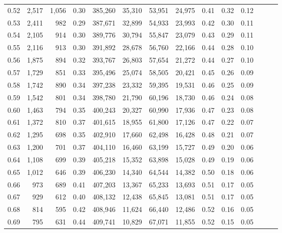 \begin{tabular}{rrrrrrrrrrrrrr}
0.52 &   2,517 &  1,056 &  0.30 &  385,260 &   35,310 &  53,951 &  24,975 &  0.41 &  0.32 &      0.12 \\
0.53 &   2,411 &    982 &  0.29 &  387,671 &   32,899 &  54,933 &  23,993 &  0.42 &  0.30 &      0.11 \\
0.54 &   2,105 &    914 &  0.30 &  389,776 &   30,794 &  55,847 &  23,079 &  0.43 &  0.29 &      0.11 \\
0.55 &   2,116 &    913 &  0.30 &  391,892 &   28,678 &  56,760 &  22,166 &  0.44 &  0.28 &      0.10 \\
0.56 &   1,875 &    894 &  0.32 &  393,767 &   26,803 &  57,654 &  21,272 &  0.44 &  0.27 &      0.10 \\
0.57 &   1,729 &    851 &  0.33 &  395,496 &   25,074 &  58,505 &  20,421 &  0.45 &  0.26 &      0.09 \\
0.58 &   1,742 &    890 &  0.34 &  397,238 &   23,332 &  59,395 &  19,531 &  0.46 &  0.25 &      0.09 \\
0.59 &   1,542 &    801 &  0.34 &  398,780 &   21,790 &  60,196 &  18,730 &  0.46 &  0.24 &      0.08 \\
0.60 &   1,463 &    794 &  0.35 &  400,243 &   20,327 &  60,990 &  17,936 &  0.47 &  0.23 &      0.08 \\
0.61 &   1,372 &    810 &  0.37 &  401,615 &   18,955 &  61,800 &  17,126 &  0.47 &  0.22 &      0.07 \\
0.62 &   1,295 &    698 &  0.35 &  402,910 &   17,660 &  62,498 &  16,428 &  0.48 &  0.21 &      0.07 \\
0.63 &   1,200 &    701 &  0.37 &  404,110 &   16,460 &  63,199 &  15,727 &  0.49 &  0.20 &      0.06 \\
0.64 &   1,108 &    699 &  0.39 &  405,218 &   15,352 &  63,898 &  15,028 &  0.49 &  0.19 &      0.06 \\
0.65 &   1,012 &    646 &  0.39 &  406,230 &   14,340 &  64,544 &  14,382 &  0.50 &  0.18 &      0.06 \\
0.66 &     973 &    689 &  0.41 &  407,203 &   13,367 &  65,233 &  13,693 &  0.51 &  0.17 &      0.05 \\
0.67 &     929 &    612 &  0.40 &  408,132 &   12,438 &  65,845 &  13,081 &  0.51 &  0.17 &      0.05 \\
0.68 &     814 &    595 &  0.42 &  408,946 &   11,624 &  66,440 &  12,486 &  0.52 &  0.16 &      0.05 \\
0.69 &     795 &    631 &  0.44 &  409,741 &   10,829 &  67,071 &  11,855 &  0.52 &  0.15 &      0.05 \\

\end{tabular}
